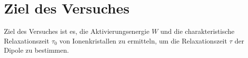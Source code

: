\section{Ziel des Versuches}
\label{sec:versuchsziel}

Ziel des Versuches ist es, die Aktivierungsenergie $W$ und die charakteristische Relaxationszeit $\tau_0$ von Ionenkristallen zu ermitteln, um die Relaxationszeit $\tau$ der Dipole zu bestimmen.